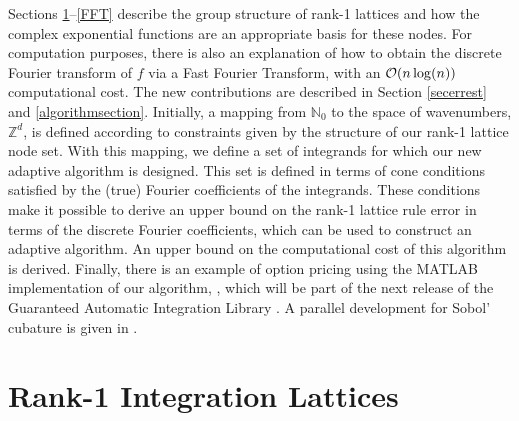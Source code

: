 \documentclass[graybox]{svmult}
\newcommand{\Z}{\mathbb{Z}} %
\newcommand{\N}{\mathbb{N}} %
\begin{document}
Sections \ref{secrank1lat}--\ref{FFT} describe the group structure of rank-1 lattices and how the complex exponential functions are an appropriate basis for these nodes. For computation purposes, there is also an explanation of how to obtain the discrete Fourier transform of $f$ via a Fast Fourier Transform, with an $\mathcal{O}(n \log(n))$ computational cost.  The new contributions are described in Section \ref{secerrest} and \ref{algorithmsection}. Initially, a mapping from $\N_0$ to the space of wavenumbers, $\Z^d$, is defined according to constraints given by the structure of our rank-1 lattice node set. With this mapping, we define a set of integrands for which our new adaptive algorithm is designed.  This set is defined in terms of cone conditions satisfied by the (true) Fourier coefficients of the integrands. These conditions make it possible to derive an upper bound on the rank-1 lattice rule error in terms of the discrete Fourier coefficients, which can be used to construct an adaptive algorithm.  An upper bound on the computational cost of this algorithm is derived. Finally, there is an example of option pricing using the MATLAB implementation of our algorithm, \cublat, which will be part of the next release of the Guaranteed Automatic Integration Library \cite{ChoEtal14a}.  A parallel development for Sobol' cubature is given in \cite{HicJim16a}.

\section{Rank-1 Integration Lattices}\label{secrank1lat}
\end{document}
